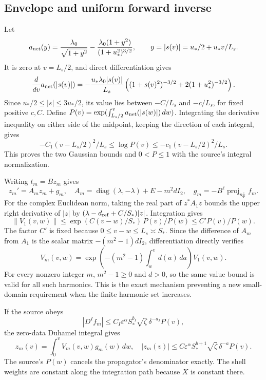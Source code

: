 \documentclass[10pt,a4paper]{article}
\begin{document}
\subsection{Envelope and uniform forward inverse}\label{envelope-and-uniform-forward-inverse}

Let \[
a_{\rm net}(y)=\frac{\lambda_0}{\sqrt{1+y^2}}-
\frac{\lambda_0(1+y^2)}{(1+u_*^2)^{3/2}},
\qquad y=|s(v)|=u_*/2+u_*v/L_s.
\] It is zero at \(v=L_s/2\), and direct differentiation gives \[
\frac{d}{dv}a_{\rm net}(|s(v)|)
=-\frac{u_*\lambda_0|s(v)|}{L_s}
\left((1+s(v)^2)^{-3/2}+2(1+u_*^2)^{-3/2}\right).
\] Since \(u_*/2\le|s|\le3u_*/2\), its value lies between \(-C/L_s\) and \(-c/L_s\), for fixed positive \(c,C\). Define \(P(v)=\exp(\int_{L_s/2}^v a_{\rm net}(|s(w)|)\,dw)\). Integrating the derivative inequality on either side of the midpoint, keeping the direction of each integral, gives \[
-C_1(v-L_s/2)^2/L_s\le\log P(v)\le-c_1(v-L_s/2)^2/L_s.
\] This proves the two Gaussian bounds and \(0<P\le1\) with the source's integral normalization.

Writing \(t_m=Bz_m\) gives \[
z_m'=A_mz_m+g_m,\quad
A_m=\operatorname{diag}(\lambda,-\lambda)+E-m^2dI_2,
\quad g_m=-B^\ell\operatorname{proj}_{n_\Phi^\perp}f_m.
\] For the complex Euclidean norm, taking the real part of \(z^*A_1z\) bounds the upper right derivative of \(|z|\) by \((\lambda-d_{\rm ref}+C/S_*)|z|\). Integration gives \[
\|V_1(v,w)\|\le
\exp(C(v-w)/S_*)\,P(v)/P(w)\le C'P(v)/P(w).
\] The factor \(C'\) is fixed because \(0\le v-w\le L_s\asymp S_*\). Since the difference of \(A_m\) from \(A_1\) is the scalar matrix \(-(m^2-1)dI_2\), differentiation directly verifies \[
V_m(v,w)=\exp\left(-(m^2-1)\int_w^v d(a)\,da\right)V_1(v,w).
\] For every nonzero integer \(m\), \(m^2-1\ge0\) and \(d>0\), so the same value bound is valid for all such harmonics. This is the exact mechanism preventing a new small-domain requirement when the finite harmonic set increases.

If the source obeys \[
|D^If_m|\le C_I\varepsilon^\alpha S_*^{b_I}
\sqrt\zeta\,\delta^{-a_I}P(v),
\] the zero-data Duhamel integral gives \[
z_m(v)=\int_0^vV_m(v,w)g_m(w)\,dw,\quad
|z_m(v)|\le C\varepsilon^\alpha S_*^{b+1}
\sqrt\zeta\,\delta^{-a}P(v).
\] The source's \(P(w)\) cancels the propagator's denominator exactly. The shell weights are constant along the integration path because \(X\) is constant there.
\end{document}
